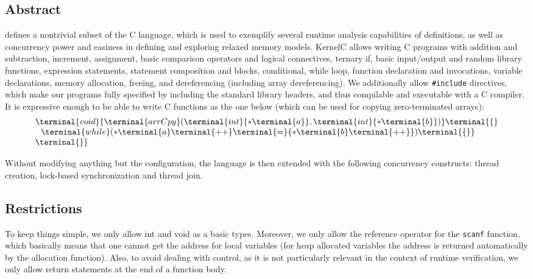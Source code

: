 \begin{latexComment}
\section{Abstract}
\KERNELC defines a nontrivial subset of the C language, which is used to exemplify several runtime analysis capabilities of \K definitions, as well as concurrency power and easiness in defining and exploring relaxed memory models.  
{\sc KernelC} allows writing C programs with addition and subtraction, increment, assignment, basic comparison operators and logical connectives, ternary if, basic input/output and random library functions, expression statements, statement composition and blocks, conditional, while loop, function declaration and invocations, variable declarations, memory allocation, freeing, and dereferencing (including array dereferencing).  
We additionally allow {\tt \#include} directives, which make our programs fully specified by including the standard library headers, and thus compilable and executable with a C compiler.
It is expressive enough to be able to write C functions as the one below (which can be used for copying zero-terminated arrays):
\[\begin{array}{l}
\terminal{void}
{
  {\terminal{arrCpy}
  }
  (\terminal{int}{
    \ast\terminal{a}
    }, \terminal{int}{
     \ast\terminal{b}
     }
     ) }
     \terminal{\{} \\
     \ \ \terminal{while}   (
     {  
       {\ast\terminal{a}}
       \terminal{++}
     }\terminal{=}
     {
     {\ast\terminal{b}}
     \terminal{++}
     }
     )\terminal{\{\}} 
   \\ \terminal{\}}
   \end{array}\]
   
Without modifying anything but the configuration, the language is then extended with the following concurrency constructs:  thread creation, lock-based synchronization and thread join.

\subsection{Restrictions}
To keep things simple, we only allow int and void as a basic types.  Moreover, we only allow the reference operator for the {\tt scanf} function, which basically means that one cannot get the address for local variables (for heap allocated variables the address is returned automatically by the allocation function).  Also, to avoid dealing with control, as it is not particularly relevant in the context of runtime verification, we only allow return statements at the end of a function body.


\end{latexComment}
